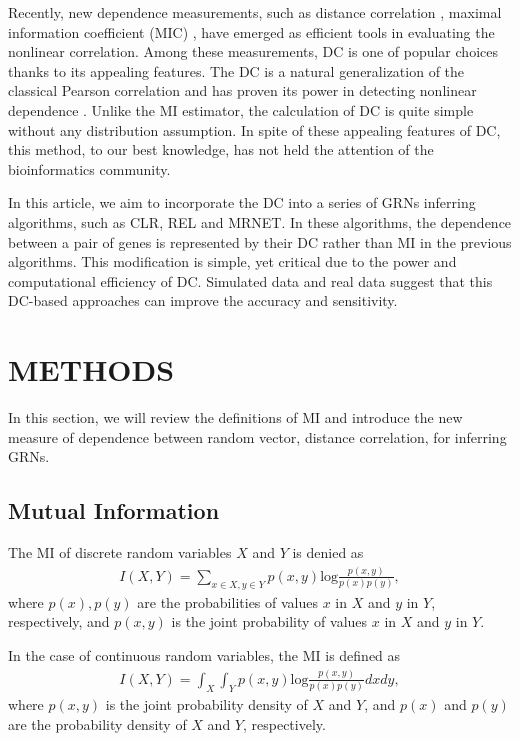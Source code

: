 \documentclass{bioinfo}
\begin{document}
Recently, new dependence measurements, such as distance correlation  \citep{szekely2007measuring}, maximal information coefficient (MIC) \citep{reshef2011detecting}, have emerged as efficient tools in evaluating the nonlinear correlation. Among these measurements, DC is one of popular choices thanks to its appealing features. The DC  is a natural generalization of the classical Pearson correlation and has proven its power in detecting nonlinear dependence \citep{gorfine2012comment,szekely2007measuring}. Unlike the MI estimator, the calculation of DC is quite simple without any distribution assumption.  In spite of  these appealing features of DC, this method, to our best knowledge, has not held the attention of the bioinformatics community.

In this article, we aim to incorporate the DC into a series of GRNs inferring algorithms, such as CLR, REL and MRNET. In these algorithms, the dependence between a pair of genes is represented by their DC rather than MI in the previous algorithms. This modification is simple, yet critical due to the power and computational efficiency of DC. Simulated data and real data suggest that this DC-based approaches can improve the accuracy and sensitivity.

\section{METHODS}
In this section, we will review the definitions of MI and introduce
the new measure of dependence between random vector, distance
correlation, for inferring GRNs.
\subsection{Mutual Information}
The MI of discrete random variables $X$ and $Y$ is denied as
\begin{align*}
    I(X,Y)=\sum_{x\in X,y\in Y} p(x,y)\mbox{log}\frac{p(x,y)}{p(x)p(y)},
\end{align*}
where $p(x),p(y)$ are the probabilities of values $x$ in $X$ and $y$
in $Y$, respectively, and $p(x,y)$ is the joint probability of
values $x$ in $X$ and $y$ in $Y$.

In the case of continuous random variables, the MI is defined as
\begin{align*}
    I(X,Y)=\int_X\int_Y p(x,y)\mbox{log}\frac{p(x,y)}{p(x)p(y)}dxdy,
\end{align*}
where $p(x,y)$ is the joint probability density of $X$ and $Y$, and $p(x)$ and $p(y)$ are the probability density of $X$ and $Y$, respectively.
\end{document}
